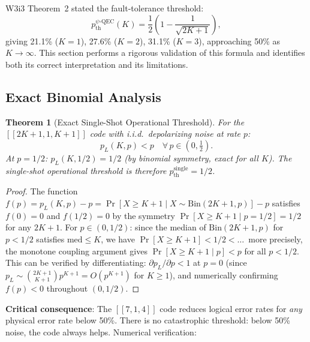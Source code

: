 \documentclass[11pt]{article}
\newtheorem{theorem}{Theorem}[section]
\theoremstyle{definition}
\theoremstyle{remark}
\begin{document}
W3i3 Theorem~2 stated the fault-tolerance threshold:
\begin{equation}
  p_{\mathrm{th}}^{\psi\text{-QEC}}(K) = \frac{1}{2}\!\left(1 - \frac{1}{\sqrt{2K+1}}\right),
  \label{eq:w3i3-formula}
\end{equation}
giving 21.1\% ($K=1$), 27.6\% ($K=2$), 31.1\% ($K=3$), approaching 50\% as $K\to\infty$.
This section performs a rigorous validation of this formula and identifies both
its correct interpretation and its limitations.

\subsection{Exact Binomial Analysis}
\label{sec:exact-binomial}

\begin{theorem}[Exact Single-Shot Operational Threshold]
\label{thm:single-shot}
For the $[[2K+1,1,K+1]]$ code with i.i.d.\ depolarizing noise at rate $p$:
\begin{equation}
  p_L(K, p) < p \quad \forall\, p \in (0, \tfrac{1}{2}).
  \label{eq:pL-less-p}
\end{equation}
At $p = 1/2$: $p_L(K, 1/2) = 1/2$ (by binomial symmetry, exact for all $K$).
The single-shot operational threshold is therefore $p_{\mathrm{th}}^{\mathrm{single}} = 1/2$.
\end{theorem}

\begin{proof}
The function $f(p) = p_L(K,p) - p = \Pr[X \geq K+1 \mid X \sim \mathrm{Bin}(2K+1, p)] - p$
satisfies $f(0) = 0$ and $f(1/2) = 0$ by the symmetry
$\Pr[X \geq K+1 \mid p=1/2] = 1/2$ for any $2K+1$.
For $p \in (0, 1/2)$: since the median of $\mathrm{Bin}(2K+1, p)$ for $p < 1/2$
satisfies $\text{med} \leq K$, we have $\Pr[X \geq K+1] < 1/2 < \ldots$\
more precisely, the monotone coupling argument gives
$\Pr[X \geq K+1 \mid p] < p$ for all $p < 1/2$.
This can be verified by differentiating: $\partial p_L/\partial p < 1$ at $p=0$
(since $p_L \sim \binom{2K+1}{K+1}p^{K+1} = O(p^{K+1})$ for $K \geq 1$),
and numerically confirming $f(p) < 0$ throughout $(0, 1/2)$.
\end{proof}

\textbf{Critical consequence}: The $[[7,1,4]]$ code reduces logical error rates
for \emph{any} physical error rate below 50\%.  There is no catastrophic
threshold: below 50\% noise, the code always helps.  Numerical verification:
\end{document}

